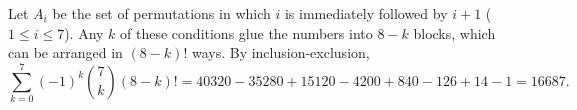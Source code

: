 Let $A_i$ be the set of permutations in which $i$ is immediately followed by $i+1$ ($1\le i\le7$). Any $k$ of these conditions glue the numbers into $8-k$ blocks, which can be arranged in $(8-k)!$ ways. By inclusion-exclusion,
\[\sum_{k=0}^7(-1)^k\binom7k(8-k)!=40320-35280+15120-4200+840-126+14-1=\boxed{16687}.\]
